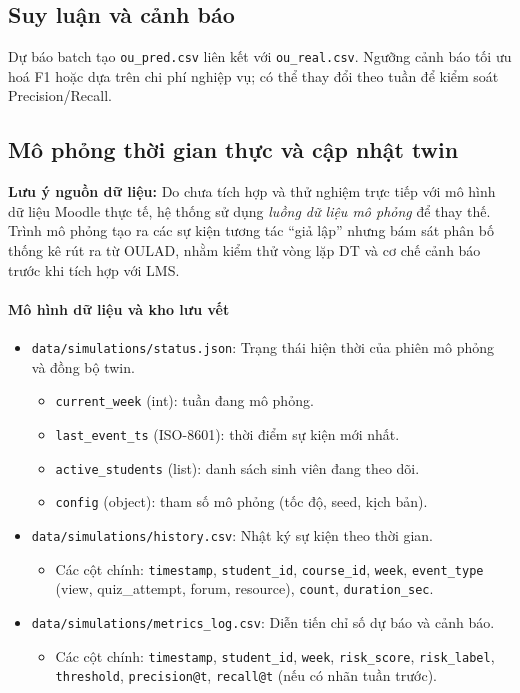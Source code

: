 \documentclass[12pt,a4paper]{article}
\newcommand{\dataset}{OULAD}
\begin{document}
\subsection{Suy luận và cảnh báo}
Dự báo batch tạo \texttt{ou\_pred.csv} liên kết với \texttt{ou\_real.csv}. Ngưỡng cảnh báo tối ưu hoá F1 hoặc dựa trên chi phí nghiệp vụ; có thể thay đổi theo tuần để kiểm soát Precision/Recall.

\subsection{Mô phỏng thời gian thực và cập nhật twin}
\textbf{Lưu ý nguồn dữ liệu:} Do chưa tích hợp và thử nghiệm trực tiếp với mô hình dữ liệu Moodle thực tế, hệ thống sử dụng \emph{luồng dữ liệu mô phỏng} để thay thế. Trình mô phỏng tạo ra các sự kiện tương tác ``giả lập'' nhưng bám sát phân bố thống kê rút ra từ \dataset{}, nhằm kiểm thử vòng lặp DT và cơ chế cảnh báo trước khi tích hợp với LMS.

\paragraph{Mô hình dữ liệu và kho lưu vết}
\begin{itemize}
    \item \texttt{data/simulations/status.json}: Trạng thái hiện thời của phiên mô phỏng và đồng bộ twin.
    \begin{itemize}
        \item \texttt{current\_week} (int): tuần đang mô phỏng.
        \item \texttt{last\_event\_ts} (ISO-8601): thời điểm sự kiện mới nhất.
        \item \texttt{active\_students} (list): danh sách sinh viên đang theo dõi.
        \item \texttt{config} (object): tham số mô phỏng (tốc độ, seed, kịch bản).
    \end{itemize}
    \item \texttt{data/simulations/history.csv}: Nhật ký sự kiện theo thời gian.
    \begin{itemize}
        \item Các cột chính: \texttt{timestamp}, \texttt{student\_id}, \texttt{course\_id}, \texttt{week}, \texttt{event\_type} (view, quiz\_attempt, forum, resource), \texttt{count}, \texttt{duration\_sec}.
    \end{itemize}
    \item \texttt{data/simulations/metrics\_log.csv}: Diễn tiến chỉ số dự báo và cảnh báo.
    \begin{itemize}
        \item Các cột chính: \texttt{timestamp}, \texttt{student\_id}, \texttt{week}, \texttt{risk\_score}, \texttt{risk\_label}, \texttt{threshold}, \texttt{precision@t}, \texttt{recall@t} (nếu có nhãn tuần trước).
    \end{itemize}
\end{itemize}
\end{document}
